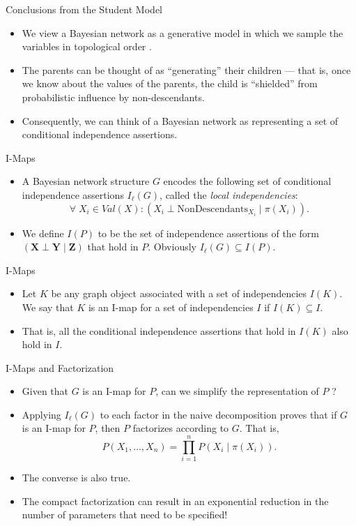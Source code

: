 \documentclass[11pt]{beamer}
\begin{document}
\begin{frame}{Conclusions from the Student Model}
\begin{itemize}
	\item We view a Bayesian network as a generative model in which we
	sample the variables in topological order \cite{pgmslides}.
	\item The parents can be thought of as ``generating'' their children ---
	that is, once we know about the values of the parents, the child is
	``shielded'' from probabilistic influence by non-descendants.
	\item Consequently, we can think of a Bayesian network as representing a
	set of conditional independence assertions.
\end{itemize}
\end{frame}

\begin{frame}{I-Maps}
\begin{itemize}
	\item A Bayesian network structure $G$ encodes the following set of
	conditional independence assertions $I_{\ell}(G)$, called the
	\emph{local independencies}:
	\[
		\forall\; X_{i} \in Val(X): (X_{i} \perp
		\text{NonDescendants}_{X_{i}} \;|\; \pi(X_{i})).
	\]
	\item We define $I(P)$ to be the set of independence assertions of the
	form $(\boldsymbol{X} \perp \boldsymbol{Y} \;|\; \boldsymbol{Z})$ that
	hold in $P$. Obviously $I_{\ell}(G) \subseteq I(P)$.
\end{itemize}
\end{frame}

\begin{frame}{I-Maps}
\begin{itemize}
	\item Let $K$ be any graph object associated with a set of
	independencies $I(K)$. We say that $K$ is an I-map for a set of
	independencies $I$ if $I(K) \subseteq I$.
	\item That is, all the conditional independence assertions that hold in
	$I(K)$ also hold in $I$.
\end{itemize}
\end{frame}

\begin{frame}{I-Maps and Factorization}
\begin{itemize}
	\item Given that $G$ is an I-map for $P$, can we simplify the
	representation of $P$ \cite{nirslides}?
	\item Applying $I_{\ell}(G)$ to each factor in the naive decomposition
	proves that if $G$ is an I-map for $P$, then $P$ factorizes according to
	$G$. That is,
	\[
		P(X_{1}, \ldots, X_{n}) = \prod_{i=1}^{n} P(X_{i} \;|\; \pi(X_{i})).
	\]
	\item The converse is also true.
	\item The compact factorization can result in an exponential reduction
	in the number of parameters that need to be specified!
\end{itemize}
\end{frame}
\end{document}
